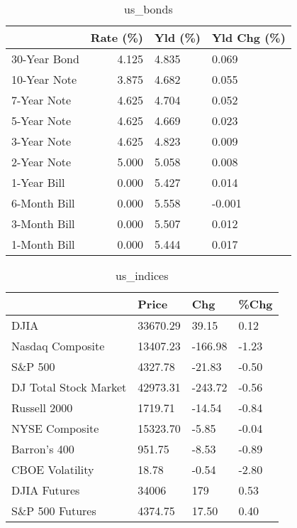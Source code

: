 \documentclass{article}%
\begin{document}
\begin{table}[htbp]%
\caption{us\_bonds}%
\centering%
\begin{adjustbox}{width=1\textwidth}%
\begin{tabular}{lrll}
\toprule
             &  Rate (\%) & Yld (\%) & Yld Chg (\%) \\
\midrule
30-Year Bond &     4.125 &   4.835 &       0.069 \\
10-Year Note &     3.875 &   4.682 &       0.055 \\
 7-Year Note &     4.625 &   4.704 &       0.052 \\
 5-Year Note &     4.625 &   4.669 &       0.023 \\
 3-Year Note &     4.625 &   4.823 &       0.009 \\
 2-Year Note &     5.000 &   5.058 &       0.008 \\
 1-Year Bill &     0.000 &   5.427 &       0.014 \\
6-Month Bill &     0.000 &   5.558 &      -0.001 \\
3-Month Bill &     0.000 &   5.507 &       0.012 \\
1-Month Bill &     0.000 &   5.444 &       0.017 \\
\bottomrule
\end{tabular}
%
\end{adjustbox}%
\end{table}

%


\begin{table}[htbp]%
\caption{us\_indices}%
\centering%
\begin{adjustbox}{width=1\textwidth}%
\begin{tabular}{llll}
\toprule
                      &    Price &     Chg &  \%Chg \\
\midrule
                 DJIA & 33670.29 &   39.15 &  0.12 \\
     Nasdaq Composite & 13407.23 & -166.98 & -1.23 \\
              S\&P 500 &  4327.78 &  -21.83 & -0.50 \\
DJ Total Stock Market & 42973.31 & -243.72 & -0.56 \\
         Russell 2000 &  1719.71 &  -14.54 & -0.84 \\
       NYSE Composite & 15323.70 &   -5.85 & -0.04 \\
         Barron's 400 &   951.75 &   -8.53 & -0.89 \\
      CBOE Volatility &    18.78 &   -0.54 & -2.80 \\
         DJIA Futures &    34006 &     179 &  0.53 \\
      S\&P 500 Futures &  4374.75 &   17.50 &  0.40 \\
\bottomrule
\end{tabular}
%
\end{adjustbox}%
\end{table}
\end{document}
